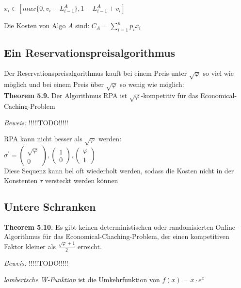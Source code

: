 $x_{i} \in [max\{0, v_{i}-L_{i-1}^{A}\}, 1-L_{i-1}^{A}+v_{i}]$

Die Kosten von Algo $A$ sind: $C_{A} = \sum_{i = 1}^{n} p_{i}x_{i}$

\subsection{Ein Reservationspreisalgorithmus}

Der Reservationspreisalgorithmus kauft bei einem Preis unter $\sqrt{\varphi}$ so viel wie möglich und bei einem Preis über $\sqrt{\varphi}$ so wenig wie möglich: \\


\textbf{Theorem 5.9.} Der Algorithmus RPA ist $\sqrt{\varphi}$-kompetitiv für das Economical-Caching-Problem

\textit{Beweis:} !!!!!TODO!!!!!

RPA kann nicht besser als $\sqrt{\varphi}$ werden: \\
$\sigma^{'} = \left(\begin{array}{c} \sqrt{\varphi} \\ 0 \end{array}\right), \left(\begin{array}{c} 1 \\ 0 \end{array}\right), \left(\begin{array}{c} \varphi \\ 1 \end{array}\right)$ \\
Diese Sequenz kann bel oft wiederholt werden, sodass die Kosten nicht in der Konstenten $\tau$ versteckt werden können

\subsection{Untere Schranken}

\textbf{Theorem 5.10.} Es gibt keinen deterministischen oder randomisierten Online-Algorithmus für das Economical-Chaching-Problem, der einen kompetitiven Faktor kleiner als $\frac{\sqrt{\varphi} +1}{2}$ erreicht.

\textit{Beweis:} !!!!!TODO!!!!!

\textit{lambertsche W-Funktion} ist die Umkehrfunktion von $f(x) = x \cdot e^{x}$


